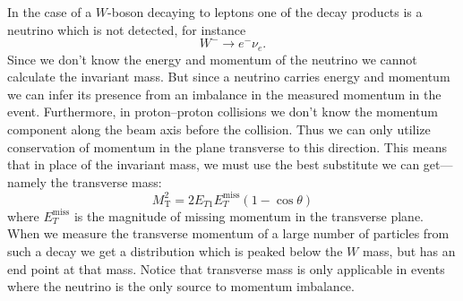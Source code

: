 In the case of a $W$-boson decaying to leptons one of the decay products is a neutrino which is not detected, for instance
\begin{displaymath}
	W^- \to e^-\nu_e.
\end{displaymath}
Since we don't know the energy and momentum of the neutrino we cannot calculate the invariant mass. But since a neutrino carries energy and momentum we can infer its presence from an imbalance in the measured momentum in the event. Furthermore, in proton--proton collisions we don't know the momentum component along the beam axis before the collision. Thus we can only utilize conservation of momentum in the plane transverse to this direction. This means that in place of the invariant mass, we must use the best substitute we can get---namely the transverse mass:
\begin{displaymath}
	M_\text{T}^2 = 2E_{T1}E_T^\text{miss}(1-\cos\theta)
\end{displaymath}
where $E_T^\text{miss}$ is the magnitude of missing momentum in the transverse plane. When we measure the transverse momentum of a large number of particles from such a decay we get a distribution which is peaked below the $W$ mass, but has an end point at that mass. Notice that transverse mass is only applicable in events where the neutrino is the only source to momentum imbalance.